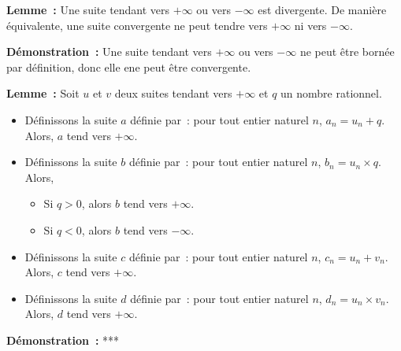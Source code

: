     \done

\medskip

\noindent\textbf{Lemme :} Une suite tendant vers $+\infty$ ou vers $-\infty$ est divergente. 
    De manière équivalente, une suite convergente ne peut tendre vers $+\infty$ ni vers $-\infty$.

\medskip

\noindent\textbf{Démonstration :} Une suite tendant vers $+\infty$ ou vers $-\infty$ ne peut être bornée par définition, donc elle ene peut être convergente.

\done

\medskip

\noindent\textbf{Lemme :} Soit $u$ et $v$ deux suites tendant vers $+\infty$ et $q$ un nombre rationnel.
    \begin{itemize}[nosep]
        \item Définissons la suite $a$ définie par : pour tout entier naturel $n$, $a_n = u_n + q$.
            Alors, $a$ tend vers $+\infty$.
        \item Définissons la suite $b$ définie par : pour tout entier naturel $n$, $b_n = u_n \times q$.
            Alors, 
            \begin{itemize}[nosep]
                \item Si $q > 0$, alors $b$ tend vers $+\infty$.
                \item Si $q < 0$, alors $b$ tend vers $-\infty$.
            \end{itemize}
        \item Définissons la suite $c$ définie par : pour tout entier naturel $n$, $c_n = u_n + v_n$.
            Alors, $c$ tend vers $+\infty$.
        \item Définissons la suite $d$ définie par : pour tout entier naturel $n$, $d_n = u_n \times v_n$.
            Alors, $d$ tend vers $+\infty$.
    \end{itemize}

\medskip

\noindent\textbf{Démonstration :} ***

\medskip

